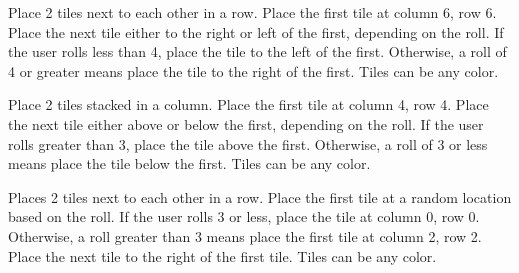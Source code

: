 
 {
Place 2 tiles next to each other in a row. Place the first tile at column 6, row 6. Place the next tile either to the right or left of the first, depending on the roll. If the user rolls less than 4, place the tile to the left of the first. Otherwise, a roll of 4 or greater means place the tile to the right of the first. Tiles can be any color.
}


 {
Place 2 tiles stacked in a column. Place the first tile at column 4, row 4. Place the next tile either above or below the first, depending on the roll. If the user rolls greater than 3, place the tile above the first. Otherwise, a roll of 3 or less means place the tile below the first. Tiles can be any color.
}
 

 {
Places 2 tiles next to each other in a row. Place the first tile at a random location based on the roll. If the user rolls 3 or less, place the tile at column 0, row 0. Otherwise, a roll greater than 3 means place the first tile at column 2, row 2. Place the next tile to the right of the first tile. Tiles can be any color.
}

